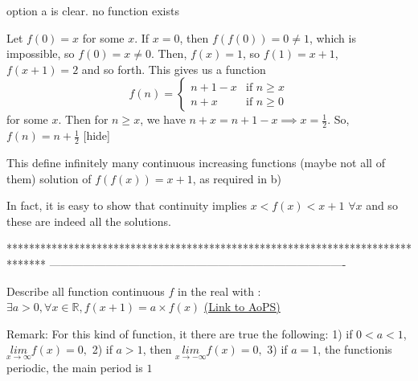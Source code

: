 \begin{solution}
	option a is clear. no function exists

\end{solution}



\begin{solution}
Let $f(0) = x$ for some $x$. If $x = 0$, then $f(f(0)) = 0 \ne 1$, which is impossible, so $f(0) = x\ne 0$. Then, $f(x) = 1$, so $f(1) = x + 1$, $f(x + 1) = 2$ and so forth. This gives us a function
$$f(n)=\begin{cases}n+1-x&\text{if }n\ge x\\n+x&\text{if }n\ge0\end{cases}$$
for some $x$. Then for $n \ge x$, we have $n+x=n+1-x\implies x=\frac12$.
So, $f(n)=n+\frac12$
[\/hide]
\end{solution}



\begin{solution}
	\begin{tcolorbox}This define infinitely many continuous increasing functions (maybe not all of them) solution of $f(f(x))=x+1$, as required in b)\end{tcolorbox}
In fact, it is easy to show that continuity implies $x<f(x)<x+1$ $\forall x$ and so these are indeed all the solutions.



\end{solution}
*******************************************************************************
-------------------------------------------------------------------------------

\begin{problem}
	Describe all function continuous $f$ in the real with : $\exists a>0, \forall x \in \mathbb R, f(x+1)=a \times f(x)$ 
	\flushright \href{https://artofproblemsolving.com/community/c6h1588012}{(Link to AoPS)}
\end{problem}



\begin{solution}
	Remark: 
For this kind of function, it there are true the following: 1) if $0<a<1$, $\underset{x\rightarrow\infty}{lim}f(x)=0,$ 2) if $a>1$, then $\underset{x\rightarrow-\infty}{lim}f(x)=0,$ 3) if $a=1$, the functionis periodic, the main period is $1$

\end{solution}




